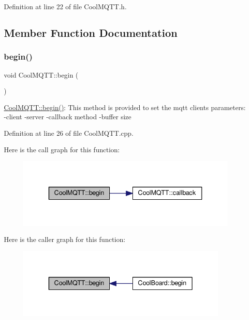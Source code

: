 Definition at line 22 of file Cool\+M\+Q\+T\+T.\+h.



\subsection{Member Function Documentation}
\mbox{\label{class_cool_m_q_t_t_ac9248808641ebf3054ed0620ea9d0100}} 
\subsubsection{\texorpdfstring{begin()}{begin()}}
{\footnotesize\ttfamily void Cool\+M\+Q\+T\+T\+::begin (\begin{DoxyParamCaption}{ }\end{DoxyParamCaption})}

\hyperlink{class_cool_m_q_t_t_ac9248808641ebf3054ed0620ea9d0100}{Cool\+M\+Q\+T\+T\+::begin()}\+: This method is provided to set the mqtt client\textquotesingle{}s parameters\+: -\/client -\/server -\/callback method -\/buffer size 

Definition at line 26 of file Cool\+M\+Q\+T\+T.\+cpp.

Here is the call graph for this function\+:\nopagebreak
\begin{figure}[H]
\begin{center}
\leavevmode
\includegraphics[width=317pt]{class_cool_m_q_t_t_ac9248808641ebf3054ed0620ea9d0100_cgraph}
\end{center}
\end{figure}
Here is the caller graph for this function\+:\nopagebreak
\begin{figure}[H]
\begin{center}
\leavevmode
\includegraphics[width=302pt]{class_cool_m_q_t_t_ac9248808641ebf3054ed0620ea9d0100_icgraph}
\end{center}
\end{figure}
\mbox{\label{class_cool_m_q_t_t_a30d82ad665bfb603f46ecdbc290775df}} 
